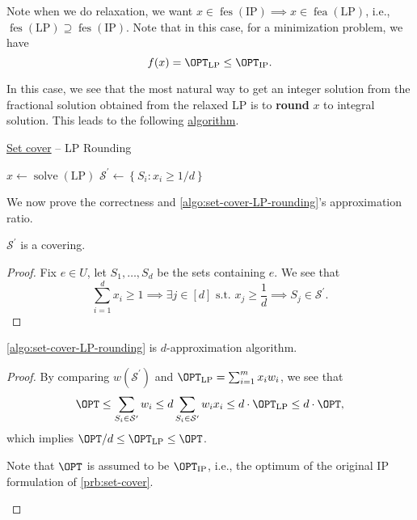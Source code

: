 \begin{note}
	Note when we do relaxation, we want \(x\in \mathop{\mathrm{fes}}(\text{IP}) \implies x\in \mathop{\mathrm{fea}}(\text{LP})\), i.e., \(\mathop{\mathrm{fes}}(\text{LP})\supseteq \mathop{\mathrm{fes}}(\text{IP})\). Note that in this case, for a minimization problem, we have
	\[
		f(x) = \OPT_\text{LP} \leq \OPT_\text{IP}.
	\]
\end{note}

In this case, we see that the most natural way to get an integer solution from the fractional solution obtained from the relaxed LP is to \textbf{round} \(x\) to integral solution. This leads to the following \hyperref[algo:set-cover-LP-rounding]{algorithm}.

\par
\begin{algorithm}[H]\label{algo:set-cover-LP-rounding}
	\DontPrintSemicolon
	\caption{\hyperref[prb:set-cover]{Set cover} -- LP Rounding}
	\BlankLine
	\(x\gets\mathop{\mathrm{solve}}(\text{LP})\)
	\(\mathcal{S} ^\prime \gets \left\{ S_i \colon x_{i} \geq 1 / d \right\}\)\;
	\;
\end{algorithm}

We now prove the correctness and \autoref{algo:set-cover-LP-rounding}'s approximation ratio.
\begin{lemma}
	\(\mathcal{S} ^\prime \) is a covering.
\end{lemma}
\begin{proof}
	Fix \(e\in U\), let \(S_1, \dots  , S_d\) be the sets containing \(e\). We see that
	\[
		\sum_{i=1}^{d} x_{i} \geq 1\implies \exists j\in[d] \text{ s.t. } x_j \geq \frac{1}{d} \implies S_j\in \mathcal{S} ^\prime.
	\]
\end{proof}

\begin{theorem}\label{thm:lec2-1}
	\autoref{algo:set-cover-LP-rounding} is \(d\)-approximation algorithm.
\end{theorem}
\begin{proof}
	By comparing \(w(\mathcal{S} ^\prime )\) and \(\OPT_\text{LP} = \sum_{i=1}^{m} x_{i} w_{i}\), we see that
	\[
		\OPT \leq \sum_{S_i\in \mathcal{S} ^\prime }w_i \leq d \sum_{S_i\in \mathcal{S} ^\prime }w_{i} x_{i} \leq d\cdot \OPT_\text{LP} \leq d\cdot \OPT,
	\]
	which implies \(\OPT / d\leq \OPT_\text{LP} \leq \OPT\).

	\begin{note}
		Note that \(\OPT\) is assumed to be \(\OPT_{\text{IP}}\), i.e., the optimum of the original IP formulation of \autoref{prb:set-cover}.
	\end{note}
\end{proof}

